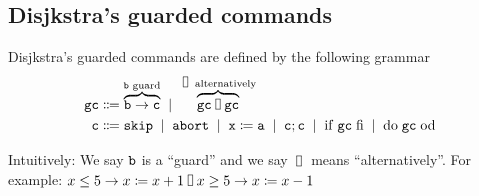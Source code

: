 {{%





\subsection{Disjkstra's guarded commands}


\begin{definition}[Syntax]
    Disjkstra's guarded commands are defined by the following grammar
    \begin{align*}
         \sgc &\Coloneqq \overbrace{\ssb \to \ssc}^{\ssb \text{ guard}} \; \mid \;  \overbrace{\sgc \vor \sgc}^{\vor \text{ alternatively}} \\
         \ssc &\Coloneqq \sskip \; \mid \; \sabort \; \mid \; \simp{x} \coloneqq \simp{a} \; \mid \; \ssc; \ssc \; \mid \; \siffi{\sgc} \; \mid \; \sdo{\sgc}
    \end{align*}
\end{definition}

\begin{example}
    Intuitively: We say $\mathtt{b}$ is a ``guard'' and we say $\vor$ means ``alternatively''. For example:
    $ x \leq 5 \to x \coloneq x + 1 \vor x \geq 5 \to x \coloneq x - 1 $
\end{example}

}}
